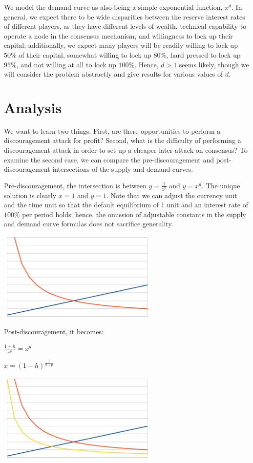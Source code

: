 \documentclass[12pt]{article}
\begin{document}
We model the demand curve as also being a simple exponential function, $x^d$. In general, we expect there to be wide disparities between the reserve interest rates of different players, as they have different levels of wealth, technical capability to operate a node in the consensus mechanism, and willingness to lock up their capital; additionally, we expect many players will be readily willing to lock up $50\%$ of their capital, somewhat willing to lock up $80\%$, hard pressed to lock up $95\%$, and not willing at all to lock up $100\%$. Hence, $d > 1$ seems likely, though we will consider the problem abstractly and give results for various values of $d$.

\section{Analysis}

We want to learn two things. First, are there opportunities to perform a discouragement attack for profit? Second, what is the difficulty of performing a discouragement attack in order to set up a cheaper later attack on consensus? To examine the second case, we can compare the pre-discouragement and post-discouragement intersections of the supply and demand curves.

Pre-discouragement, the intersection is between $y = \frac{1}{x^p}$ and $y = x^d$. The unique solution is clearly $x=1$ and $y=1$. Note that we can adjust the currency unit and the time unit so that the default equilibrium of 1 unit and an interest rate of $100\%$ per period holds; hence, the omission of adjustable constants in the supply and demand curve formulas does not sacrifice generality.

\includegraphics[width=300px]{disc_chart1.png}

Post-discouragement, it becomes:

$\frac{1-h}{x^p} = x^d$

$x=(1-h)^{\frac{1}{d+p}}$

\includegraphics[width=300px]{disc_chart2.png}
\end{document}
